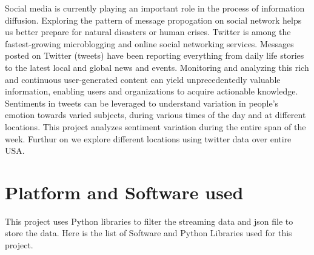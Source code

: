 \documentclass[12pt, oneside]{article}   	%
\begin{document}
Social media is currently  playing an important role in the process of information diffusion. Exploring the pattern of message propogation on social network helps us better prepare for natural disasters or human crises. Twitter is among the fastest‐growing microblogging and online social networking services.  Messages posted on Twitter (tweets) have been reporting everything from daily life stories to the latest local and global news and events. Monitoring and analyzing this rich and continuous user‐generated content can yield unprecedentedly valuable information, enabling users and organizations to acquire actionable knowledge. Sentiments in tweets can be leveraged to understand variation in people's emotion towards varied subjects, during various times of the day and at different locations. This project analyzes sentiment variation during the entire span of the week. Furthur on we explore different locations using twitter data over entire USA. 


\section{Platform and Software used}

This project uses Python libraries to filter the streaming data and json file to store the data. Here is the list of Software and Python Libraries used for this project.
\end{document}
